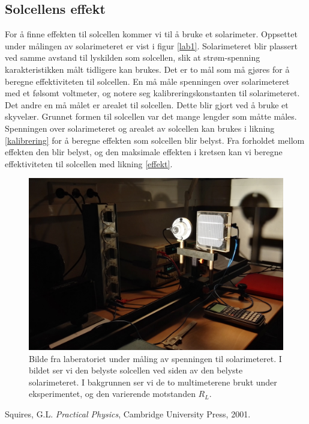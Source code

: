 \documentclass[%
 reprint,
 amsmath,amssymb,
 aps,
 norsk,
 booktabs
]{revtex4-1}
\begin{document}
\subsection{Solcellens effekt}
For å finne effekten til solcellen kommer vi til å bruke et solarimeter. Oppsettet under målingen av solarimeteret er vist i figur \vref{lab1}. Solarimeteret blir plassert ved samme avstand til lyskilden som solcellen, slik at strøm-spenning karakteristikken målt tidligere kan brukes. Det er to mål som må gjøres for å beregne effektiviteten til solcellen. En må måle spenningen over solarimeteret med et følsomt voltmeter, og notere seg kalibreringskonstanten til solarimeteret. Det andre en må målet er arealet til solcellen. Dette blir gjort ved å bruke et skyvelær. Grunnet formen til solcellen var det mange lengder som måtte måles. Spenningen over solarimeteret og arealet av solcellen kan brukes i likning \eqref{kalibrering} for å beregne effekten som solcellen blir belyst. Fra forholdet mellom effekten den blir belyst, og den maksimale effekten i kretsen kan vi beregne effektiviteten til solcellen med likning \eqref{effekt}.
\begin{figure}[h!]
  \centering
  \includegraphics[scale=0.065]{lab1.jpg}
  \caption{Bilde fra laberatoriet under måling av spenningen til solarimeteret. I bildet ser vi den belyste solcellen ved siden av den belyste solarimeteret. I bakgrunnen ser vi de to multimeterene brukt under eksperimentet, og den varierende motstanden $R_L$.}
  \label{lab1}
\end{figure}
\begin{thebibliography}{9}
Squires, G.L. \emph{Practical Physics}, Cambridge University Press, 2001.
\end{thebibliography}
\end{document}
